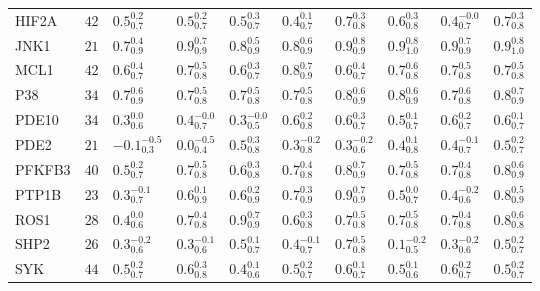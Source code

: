 \begin{tabular}{llllllllll}
HIF2A       &   $42$ &    $0.5^{0.2}_{0.7}$ &   $0.5^{0.2}_{0.7}$ &    $0.5^{0.3}_{0.7}$ &   $0.4^{0.1}_{0.7}$ &   $0.7^{0.3}_{0.8}$ &   $0.6^{0.3}_{0.8}$ &    $0.4^{-0.0}_{0.7}$ &   $0.7^{0.3}_{0.8}$ \\
JNK1        &   $21$ &    $0.7^{0.4}_{0.9}$ &   $0.9^{0.7}_{0.9}$ &    $0.8^{0.5}_{0.9}$ &   $0.8^{0.6}_{0.9}$ &   $0.9^{0.8}_{0.9}$ &   $0.9^{0.8}_{1.0}$ &     $0.9^{0.7}_{0.9}$ &   $0.9^{0.8}_{1.0}$ \\
MCL1        &   $42$ &    $0.6^{0.4}_{0.7}$ &   $0.7^{0.5}_{0.8}$ &    $0.6^{0.3}_{0.7}$ &   $0.8^{0.7}_{0.9}$ &   $0.6^{0.4}_{0.7}$ &   $0.7^{0.6}_{0.8}$ &     $0.7^{0.5}_{0.8}$ &   $0.7^{0.5}_{0.8}$ \\
P38         &   $34$ &    $0.7^{0.6}_{0.9}$ &   $0.7^{0.5}_{0.8}$ &    $0.7^{0.5}_{0.8}$ &   $0.7^{0.5}_{0.8}$ &   $0.8^{0.6}_{0.9}$ &   $0.8^{0.6}_{0.9}$ &     $0.7^{0.6}_{0.8}$ &   $0.8^{0.7}_{0.9}$ \\
PDE10       &   $34$ &    $0.3^{0.0}_{0.6}$ &  $0.4^{-0.0}_{0.7}$ &   $0.3^{-0.0}_{0.5}$ &   $0.6^{0.2}_{0.8}$ &   $0.6^{0.3}_{0.7}$ &   $0.5^{0.1}_{0.7}$ &     $0.6^{0.2}_{0.7}$ &   $0.6^{0.1}_{0.7}$ \\
PDE2        &   $21$ &  $-0.1^{-0.5}_{0.3}$ &  $0.0^{-0.5}_{0.4}$ &    $0.5^{0.3}_{0.8}$ &  $0.3^{-0.2}_{0.8}$ &  $0.3^{-0.2}_{0.6}$ &   $0.4^{0.1}_{0.8}$ &    $0.4^{-0.1}_{0.7}$ &   $0.5^{0.2}_{0.7}$ \\
PFKFB3      &   $40$ &    $0.5^{0.2}_{0.7}$ &   $0.7^{0.5}_{0.8}$ &    $0.6^{0.3}_{0.8}$ &   $0.7^{0.4}_{0.8}$ &   $0.8^{0.7}_{0.9}$ &   $0.7^{0.5}_{0.8}$ &     $0.7^{0.4}_{0.8}$ &   $0.8^{0.6}_{0.9}$ \\
PTP1B       &   $23$ &   $0.3^{-0.1}_{0.7}$ &   $0.6^{0.1}_{0.9}$ &    $0.6^{0.2}_{0.9}$ &   $0.7^{0.3}_{0.9}$ &   $0.9^{0.7}_{0.9}$ &   $0.5^{0.0}_{0.7}$ &    $0.4^{-0.2}_{0.6}$ &   $0.8^{0.5}_{0.9}$ \\
ROS1        &   $28$ &    $0.4^{0.0}_{0.6}$ &   $0.7^{0.4}_{0.8}$ &    $0.9^{0.7}_{0.9}$ &   $0.6^{0.3}_{0.8}$ &   $0.7^{0.5}_{0.8}$ &   $0.7^{0.5}_{0.8}$ &     $0.7^{0.4}_{0.8}$ &   $0.8^{0.6}_{0.8}$ \\
SHP2        &   $26$ &   $0.3^{-0.2}_{0.6}$ &  $0.3^{-0.1}_{0.6}$ &    $0.5^{0.1}_{0.7}$ &  $0.4^{-0.1}_{0.7}$ &   $0.7^{0.5}_{0.8}$ &  $0.1^{-0.2}_{0.5}$ &    $0.3^{-0.2}_{0.6}$ &   $0.5^{0.2}_{0.7}$ \\
SYK         &   $44$ &    $0.5^{0.2}_{0.7}$ &   $0.6^{0.3}_{0.8}$ &    $0.4^{0.1}_{0.6}$ &   $0.5^{0.2}_{0.7}$ &   $0.6^{0.1}_{0.7}$ &   $0.5^{0.1}_{0.6}$ &     $0.6^{0.2}_{0.7}$ &   $0.5^{0.2}_{0.7}$ \\

\end{tabular}
